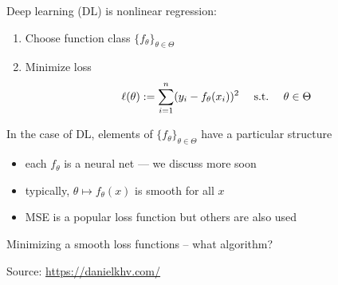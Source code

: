 \begin{frame}

    Deep learning (DL) is nonlinear regression: 

    \begin{enumerate}
        \item Choose function class $\{f_\theta\}_{\theta \in \Theta}$ 
            \vspace{0.4em}
        \item Minimize loss 
            \begin{equation*}
                \ell(\theta) := \sum_{i=1}^n (y_i - f_\theta(x_i))^2
                \quad \ \mathrm{s.t.}\  \quad \theta \in \Theta
            \end{equation*}
    \end{enumerate}


    \pause
    \vspace{0.5em}
    In the case of DL, elements of $\{f_\theta\}_{\theta \in \Theta}$
    have a particular structure

    \begin{itemize}
        \item each $f_\theta$ is a neural net --- we discuss more soon
        \vspace{0.5em}
        \item typically, $\theta \mapsto f_\theta(x)$ is smooth for all $x$
        \vspace{0.5em}
        \item MSE is a popular loss function but others are also used
    \end{itemize}

\end{frame}


\begin{frame}
    

    Minimizing a smooth loss functions  -- what algorithm?
    
    \begin{figure}
       \begin{center}
       \end{center}
    \end{figure}

    Source: \url{https://danielkhv.com/}

\end{frame}


